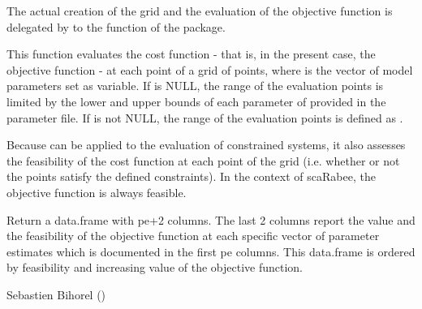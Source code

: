 %
\begin{Details}\relax
The actual creation of the grid and the evaluation of the objective function
is delegated by  to the  
function of the  package.

This function evaluates the cost function - that is, in the present case, the
objective function - at each point of a grid of  points,
where  is the vector of model parameters set as variable. If 
 is NULL, the range of the evaluation points is limited by the 
lower and upper bounds of each parameter of  provided in the 
parameter file. If  is not NULL, the range of the evaluation 
points is defined as .

Because  can be applied to the evaluation of constrained 
systems, it also assesses the feasibility of the cost function at each point
of the grid (i.e. whether or not the points satisfy the defined constraints). 
In the context of scaRabee, the objective function is always feasible.
\end{Details}
%
\begin{Value}
Return a data.frame with pe+2 columns. The last 2 columns report the value 
and the feasibility of the objective function at each specific vector of 
parameter estimates which is documented in the first pe columns. This 
data.frame is ordered by feasibility and increasing value of the objective
function.
\end{Value}
%
\begin{Author}\relax
Sebastien Bihorel ()
\end{Author}
%
\begin{SeeAlso}\relax
{}
\end{SeeAlso}

